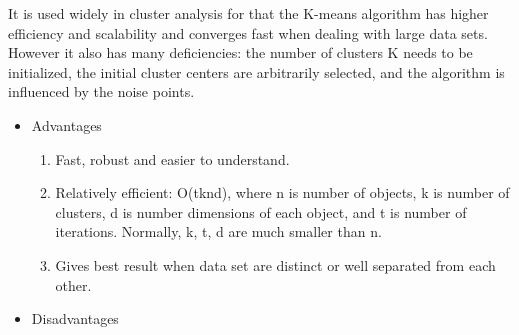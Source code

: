  It is used widely in cluster analysis for that the K-means algorithm has higher efficiency and scalability and converges fast when dealing with large data sets. However it also has many deficiencies: the number of clusters K needs to be initialized, the initial cluster centers are arbitrarily selected, and the algorithm is influenced by the noise points.
\begin{itemize}
	\item Advantages
		\begin{enumerate}[+)]
			\item Fast, robust and easier to understand.
			\item Relatively efficient: O(tknd), where n is number of objects, k is number of clusters, d is number dimensions of each object, and t  is number of iterations. Normally, k, t, d are much smaller than n.
			\item Gives best result when data set are distinct or well separated from each other.
		\end{enumerate}
	
	\item Disadvantages
	
	
\end{itemize}
